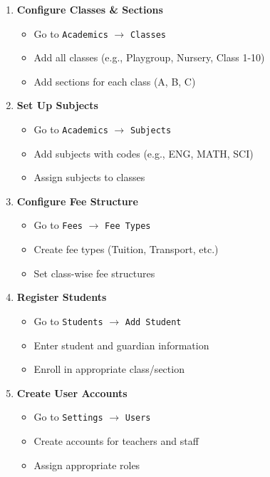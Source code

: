 \documentclass[12pt,a4paper]{report}
\begin{document}
\begin{enumerate}[leftmargin=*]
    \item \textbf{Configure Classes \& Sections}
    \begin{itemize}
        \item Go to \texttt{Academics} $\rightarrow$ \texttt{Classes}
        \item Add all classes (e.g., Playgroup, Nursery, Class 1-10)
        \item Add sections for each class (A, B, C)
    \end{itemize}
    
    \item \textbf{Set Up Subjects}
    \begin{itemize}
        \item Go to \texttt{Academics} $\rightarrow$ \texttt{Subjects}
        \item Add subjects with codes (e.g., ENG, MATH, SCI)
        \item Assign subjects to classes
    \end{itemize}
    
    \item \textbf{Configure Fee Structure}
    \begin{itemize}
        \item Go to \texttt{Fees} $\rightarrow$ \texttt{Fee Types}
        \item Create fee types (Tuition, Transport, etc.)
        \item Set class-wise fee structures
    \end{itemize}
    
    \item \textbf{Register Students}
    \begin{itemize}
        \item Go to \texttt{Students} $\rightarrow$ \texttt{Add Student}
        \item Enter student and guardian information
        \item Enroll in appropriate class/section
    \end{itemize}
    
    \item \textbf{Create User Accounts}
    \begin{itemize}
        \item Go to \texttt{Settings} $\rightarrow$ \texttt{Users}
        \item Create accounts for teachers and staff
        \item Assign appropriate roles
    \end{itemize}
\end{enumerate}
\end{document}
